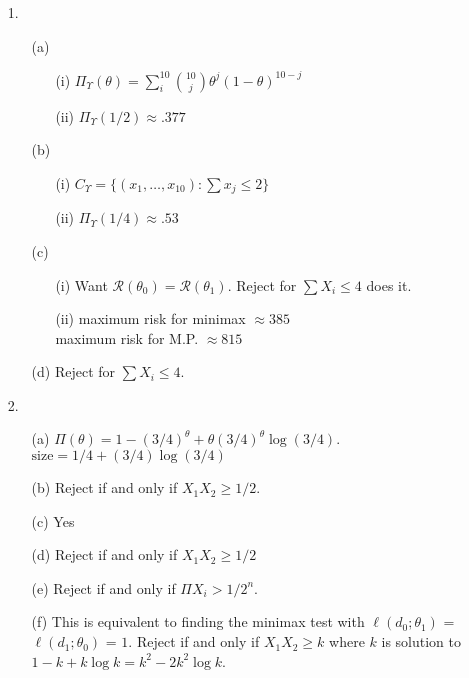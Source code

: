 \begin{enumerate}
	\item[1.] \begin{enumerate}
		\item[(a)] \begin{enumerate}
			\item[(i)] $\Pi_\Upsilon(\theta) = \sum\limits_{i}^{10}{10\choose j}\theta^j(1-\theta)^{10-j}$
			\item[(ii)] $\Pi_\Upsilon(1/2)\approx .377$
		\end{enumerate}
		\item[(b)] \begin{enumerate}
			\item[(i)] $C_\Upsilon = \{(x_1,\ldots,x_{10})\colon \sum x_j \le 2\}$
			\item[(ii)] $\Pi_\Upsilon(1/4) \approx .53$
		\end{enumerate}
		\item[(c)] \begin{enumerate}
			\item[(i)] Want $\mathcal{R}(\theta_0) = \mathcal{R}(\theta_1)$. Reject for $\sum X_i \le 4$ does it.
			\item[(ii)] maximum risk for minimax $\approx 385$ \\
						maximum risk for M.P. $\approx 815$
		\end{enumerate}
		\item[(d)] Reject for $\sum X_i \le 4$.
	\end{enumerate}

	\item[2.] \begin{enumerate}
		\item[(a)] $\Pi(\theta) = 1 - (3/4)^\theta + \theta(3/4)^\theta\log(3/4)$. \\
					$\mbox{size} = 1/4 + (3/4)\log(3/4)$
		\item[(b)] Reject if and only if $X_1X_2 \ge 1/2$.
		\item[(c)] Yes
		\item[(d)] Reject if and only if $X_1X_2 \ge 1/2$
		\item[(e)] Reject if and only if $\Pi X_i > 1/2^n$.
		\item[(f)] This is equivalent to finding the minimax test with %
		$\ell(d_0;\theta_1)$ = $\ell(d_1;\theta_0)$ = $1$. Reject if and only if $X_1X_2 \ge k$ where $k$ is solution to $1-k+k\log k = k^2-2k^2\log k$.
	\end{enumerate}


\end{enumerate}
